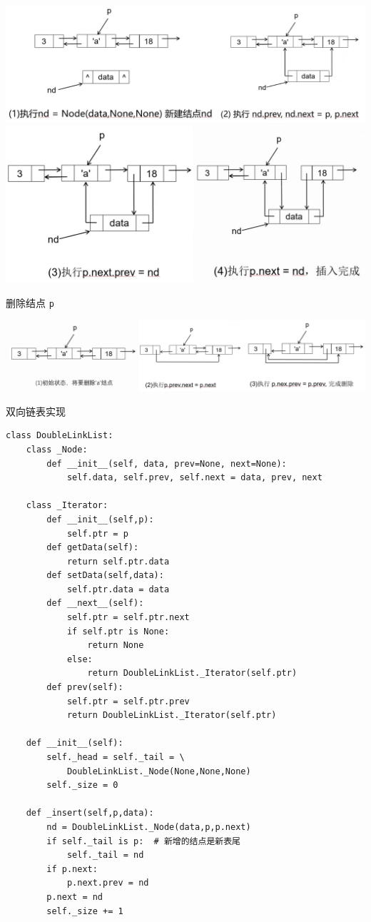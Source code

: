 \documentclass[10pt,UTF8,a4paper]{ctexart}
\begin{document}
\begin{multicols}{3}
\includegraphics[width=\columnwidth]{images/双向链表插入1.jpg}
\includegraphics[width=\columnwidth]{images/双向链表插入2.jpg}

删除结点 \verb|p|

\includegraphics[width=\columnwidth]{images/双向链表删除.jpg}

双向链表实现
\begin{lstlisting}[style=python]
class DoubleLinkList:
	class _Node:
		def __init__(self, data, prev=None, next=None):
			self.data, self.prev, self.next = data, prev, next

	class _Iterator: 
		def __init__(self,p):
			self.ptr = p
		def getData(self):
			return self.ptr.data
		def setData(self,data):
			self.ptr.data = data
		def __next__(self):
			self.ptr = self.ptr.next
			if self.ptr is None:
				return None
			else:
				return DoubleLinkList._Iterator(self.ptr)
        def prev(self):
			self.ptr = self.ptr.prev
			return DoubleLinkList._Iterator(self.ptr)

	def __init__(self):
		self._head = self._tail = \
			DoubleLinkList._Node(None,None,None)
		self._size = 0

	def _insert(self,p,data):
		nd = DoubleLinkList._Node(data,p,p.next)
		if self._tail is p:  # 新增的结点是新表尾
			self._tail = nd
		if p.next:
			p.next.prev = nd
		p.next = nd
		self._size += 1


\end{lstlisting}
\end{multicols}
\end{document}
